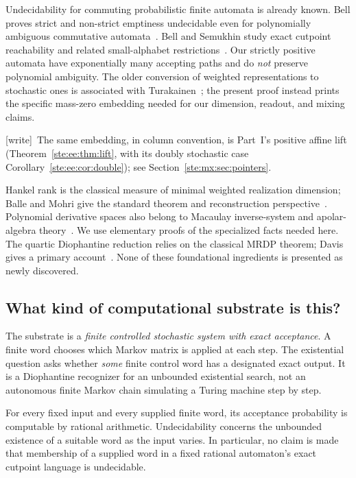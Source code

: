 \documentclass[11pt,letterpaper]{article}
\theoremstyle{definition}
\theoremstyle{remark}
\newcommand{\wtag}{\textup{[write]}}
\begin{document}
Undecidability for commuting probabilistic finite automata is already known.
Bell proves strict and non-strict emptiness undecidable even for polynomially
ambiguous commutative automata~\cite{bell}. Bell and Semukhin study exact
cutpoint reachability and related small-alphabet restrictions~\cite{bell-semukhin}.
Our strictly positive automata have exponentially many accepting paths and do
\emph{not} preserve polynomial ambiguity. The older conversion of weighted
representations to stochastic ones is associated with
Turakainen~\cite{turakainen}; the present proof instead prints the specific
mass-zero embedding needed for our dimension, readout, and mixing claims.

\wtag\ The same embedding, in column convention, is Part~I's positive affine lift (Theorem~\ref{ste:ee:thm:lift}, with its doubly stochastic case Corollary~\ref{ste:ee:cor:double}); see Section~\ref{ste:mx:sec:pointers}.

Hankel rank is the classical measure of minimal weighted realization dimension;
Balle and Mohri give the standard theorem and reconstruction
perspective~\cite{balle-mohri}. Polynomial derivative spaces also belong to
Macaulay inverse-system and apolar-algebra theory~\cite{jelisiejew,masuti-rossi}.
We use elementary proofs of the specialized facts needed here. The quartic
Diophantine reduction relies on the classical MRDP theorem; Davis gives a
primary account~\cite{davis}. None of these foundational ingredients is
presented as newly discovered.

\subsection{What kind of computational substrate is this?}

The substrate is a \emph{finite controlled stochastic system with exact
acceptance}. A finite word chooses which Markov matrix is applied at each
step. The existential question asks whether \emph{some} finite control word
has a designated exact output. It is a Diophantine recognizer for an unbounded
existential search, not an autonomous finite Markov chain simulating a Turing
machine step by step.

For every fixed input and every supplied finite word, its acceptance probability
is computable by rational arithmetic. Undecidability concerns the unbounded
existence of a suitable word as the input varies. In particular, no claim is
made that membership of a supplied word in a fixed rational automaton's exact
cutpoint language is undecidable.
\end{document}
